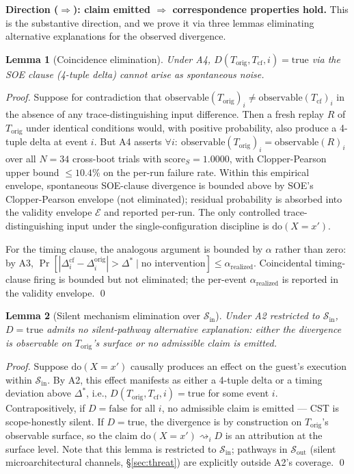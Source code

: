 \documentclass[conference]{IEEEtran}
\newtheorem{lemma}{Lemma}
\newcommand{\Korig}{T_\text{orig}}
\newcommand{\Tcf}{T_\text{cf}}
\newcommand{\Dstar}{\Delta^{*}}
\newcommand{\arealized}{\alpha_\text{realized}}
\newcommand{\scoreS}{\text{score}_S}
\newcommand{\dox}[1]{\text{do}(X{=}#1)}
\begin{document}
\textbf{Direction ($\Rightarrow$): claim emitted $\Rightarrow$
correspondence properties hold.} This is the substantive
direction, and we prove it via three lemmas eliminating
alternative explanations for the observed divergence.

\begin{lemma}[Coincidence elimination]
\label{lem:coincidence}
Under A4, $D(\Korig, \Tcf, i) = \text{true}$ via the SOE clause
(4-tuple delta) cannot arise as spontaneous noise.
\end{lemma}

\textit{Proof.} Suppose for contradiction that
$\text{observable}(\Korig)_i \neq \text{observable}(\Tcf)_i$ in the
absence of any trace-distinguishing input difference. Then a fresh
replay $R$ of $\Korig$ under identical conditions would, with
positive probability, also produce a 4-tuple delta at event $i$.
But A4 asserts $\forall i:\ \text{observable}(\Korig)_i =
\text{observable}(R)_i$ over all $N{=}34$ cross-boot trials with
$\scoreS = 1.0000$, with Clopper-Pearson upper bound
$\leq 10.4\%$ on the per-run failure rate. Within this empirical
envelope, spontaneous SOE-clause divergence is bounded above by
SOE's Clopper-Pearson envelope (not eliminated); residual
probability is absorbed into the validity envelope $\mathcal{E}$
and reported per-run. The only controlled trace-distinguishing
input under the single-configuration discipline is $\dox{x'}$.

For the timing clause, the analogous argument is bounded by $\alpha$
rather than zero: by A3, $\Pr[|\Delta_i^{\text{cf}} -
\Delta_i^{\text{orig}}| > \Dstar \mid \text{no intervention}] \leq
\arealized$. Coincidental timing-clause firing is bounded but not
eliminated; the per-event $\arealized$ is reported in the validity
envelope. \qed

\begin{lemma}[Silent mechanism elimination over $\mathcal{S}_\text{in}$]
\label{lem:silent}
Under A2 restricted to $\mathcal{S}_\text{in}$, $D = \text{true}$
admits no silent-pathway alternative explanation: either the
divergence is observable on $\Korig$'s surface or no admissible
claim is emitted.
\end{lemma}

\textit{Proof.} Suppose $\dox{x'}$ causally produces an effect on
the guest's execution within $\mathcal{S}_\text{in}$. By A2, this
effect manifests as either a 4-tuple delta or a timing deviation
above $\Dstar$, i.e., $D(\Korig, \Tcf, i) = \text{true}$ for some
event $i$. Contrapositively, if $D = \text{false}$ for all $i$, no
admissible claim is emitted --- CST is scope-honestly silent. If
$D = \text{true}$, the divergence is by construction on $\Korig$'s
observable surface, so the claim
$\dox{x'} \rightsquigarrow_i D$ is an attribution at the surface
level. Note that this lemma is restricted to
$\mathcal{S}_\text{in}$; pathways in $\mathcal{S}_\text{out}$
(silent microarchitectural channels, \S\ref{sec:threat}) are
explicitly outside A2's coverage. \qed
\end{document}
